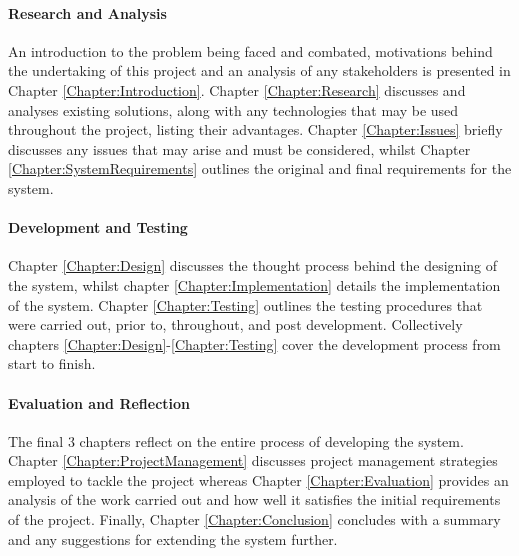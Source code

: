 \paragraph{Research and Analysis}
An introduction to the problem being faced and combated, motivations behind the undertaking of this project and an analysis of any stakeholders is presented in Chapter \ref{Chapter:Introduction}. Chapter \ref{Chapter:Research} discusses and analyses existing solutions, along with any technologies that may be used throughout the project, listing their advantages. Chapter \ref{Chapter:Issues} briefly discusses any issues that may arise and must be considered, whilst Chapter \ref{Chapter:SystemRequirements} outlines the original and final requirements for the system.

\paragraph{Development and Testing}
Chapter \ref{Chapter:Design} discusses the thought process behind the designing of the system, whilst chapter \ref{Chapter:Implementation} details the implementation of the system. Chapter \ref{Chapter:Testing} outlines the testing procedures that were carried out, prior to, throughout, and post development. Collectively chapters \ref{Chapter:Design}-\ref{Chapter:Testing} cover the development process from start to finish.

\paragraph{Evaluation and Reflection}
The final 3 chapters reflect on the entire process of developing the system. Chapter \ref{Chapter:ProjectManagement} discusses project management strategies employed to tackle the project whereas Chapter \ref{Chapter:Evaluation} provides an analysis of the work carried out and how well it satisfies the initial requirements of the project. Finally, Chapter \ref{Chapter:Conclusion} concludes with a summary and any suggestions for extending the system further.
